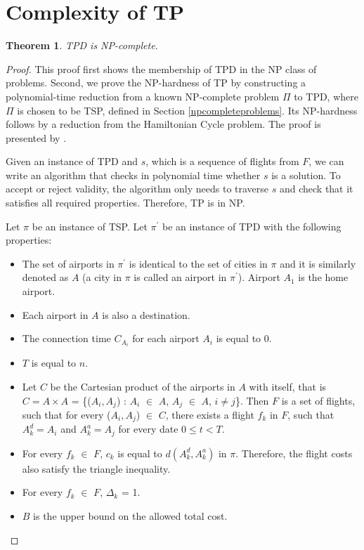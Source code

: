 \documentclass{mpaper}
\newtheorem{theorem}{Theorem}
\begin{document}
\clearpage





\appendix

\section{Complexity of TP}
\label{appendix:tpcomplexity}
\begin{theorem}
TPD is NP-complete.
\end{theorem}

\begin{proof}
This proof first shows the membership of TPD in the NP class of problems. Second, we prove the NP-hardness of TP by constructing a polynomial-time reduction from a known NP-complete problem $\Pi$ to TPD, where $\Pi$ is chosen to be TSP, defined in Section \ref{npcompleteproblems}. Its NP-hardness follows by a reduction from the Hamiltonian Cycle problem. The proof is presented by
\cite{thebible}.

Given an instance of TPD and $s$, which is a sequence of flights from $F$, we can write an algorithm that checks in polynomial time whether $s$ is a solution. To accept or reject validity, the algorithm only needs to traverse $s$ and check that it satisfies all required properties. Therefore, TP is in NP.

Let $\pi$ be an instance of TSP. Let $\pi^{\prime}$ be an instance of TPD with the following properties:
\begin{itemize}
\item The set of airports in $\pi^{\prime}$ is identical to the set of cities in $\pi$ and it is similarly denoted as $A$ (a city in $\pi$ is called an airport in $\pi^{\prime}$). Airport $A_{1}$ is the home airport.
\item Each airport in $A$ is also a destination.
\item The connection time $C_{A_{i}}$ for each airport $A_{i}$ is equal to 0.
\item $T$ is equal to $n$.
\item Let $C$ be the Cartesian product of the airports in $A$ with itself, that is $C = A \times A$ = \{($A_{i}, A_{j}$) : $A_{i}$ $\in$ $A$, $A_{j}$ $\in$ $A$, $i \neq j$\}. Then $F$ is a set of flights, such that for every ($A_{i}, A_{j}$) $\in$ $C$, there exists a flight $f_{k}$ in $F$, such that $A^{d}_{k} = A_{i}$ and $A^{a}_{k} = A_{j}$ for every date $0 \leq t < T$.
\item For every $f_{k}$ $\in$ $F$, $c_{k}$ is equal to $d(A^{d}_{k}, A^{a}_{k})$ in $\pi$. Therefore, the flight costs also satisfy the triangle inequality.
\item For every $f_{k}$ $\in$ $F$, $\Delta_{k}$ = 1.
\item $B$ is the upper bound on the allowed total cost.
\end{itemize}


\end{proof}
\end{document}
